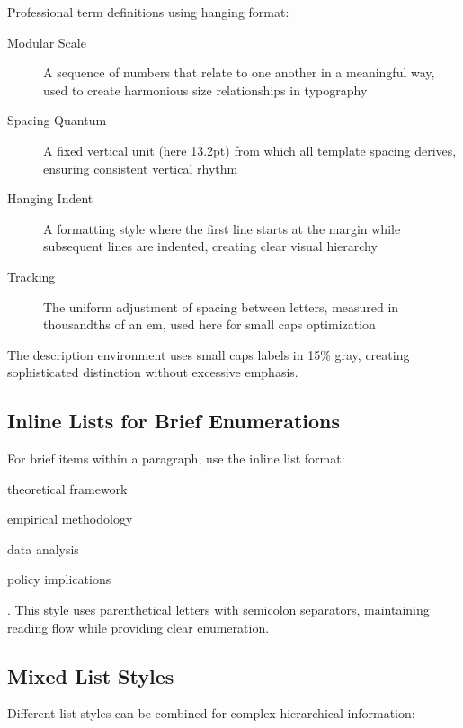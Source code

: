 \documentclass[11pt]{article}
\begin{document}
Professional term definitions using hanging format:

\begin{description}
\item[Modular Scale] A sequence of numbers that relate to one another in a meaningful way, used to create harmonious size relationships in typography
\item[Spacing Quantum] A fixed vertical unit (here 13.2pt) from which all template spacing derives, ensuring consistent vertical rhythm
\item[Hanging Indent] A formatting style where the first line starts at the margin while subsequent lines are indented, creating clear visual hierarchy
\item[Tracking] The uniform adjustment of spacing between letters, measured in thousandths of an em, used here for small caps optimization
\end{description}

The description environment uses small caps labels in 15\% gray, creating sophisticated distinction without excessive emphasis.

\subsection{Inline Lists for Brief Enumerations}

For brief items within a paragraph, use the inline list format: \begin{inlineitem}\item theoretical framework\item empirical methodology\item data analysis\item policy implications\end{inlineitem}. This style uses parenthetical letters with semicolon separators, maintaining reading flow while providing clear enumeration.

\subsection{Mixed List Styles}

Different list styles can be combined for complex hierarchical information:
\end{document}
